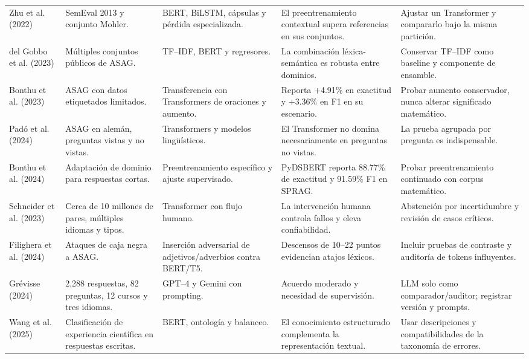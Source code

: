 \documentclass[11pt,oneside,openany]{book}
\begin{document}
\begin{longtable}{@{}P{2.55cm}P{2.5cm}P{3.05cm}P{3.15cm}P{3.05cm}@{}}
Zhu et al. (2022) & SemEval 2013 y conjunto Mohler. & BERT, BiLSTM, cápsulas y
pérdida especializada. & El preentrenamiento contextual supera referencias en sus
conjuntos. & Ajustar un Transformer y compararlo bajo la misma partición.\\[2mm]

del Gobbo et al. (2023) & Múltiples conjuntos públicos de ASAG. & TF--IDF, BERT y
regresores. & La combinación léxica-semántica es robusta entre dominios. & Conservar
TF--IDF como baseline y componente de ensamble.\\[2mm]

Bonthu et al. (2023) & ASAG con datos etiquetados limitados. & Transferencia con
Transformers de oraciones y aumento. & Reporta +4.91\% en exactitud y +3.36\% en F1
en su escenario. & Probar aumento conservador, nunca alterar significado
matemático.\\[2mm]

Padó et al. (2024) & ASAG en alemán, preguntas vistas y no vistas. & Transformers y
modelos lingüísticos. & El Transformer no domina necesariamente en preguntas no
vistas. & La prueba agrupada por pregunta es indispensable.\\[2mm]

Bonthu et al. (2024) & Adaptación de dominio para respuestas cortas. &
Preentrenamiento específico y ajuste supervisado. & PyDSBERT reporta 88.77\% de
exactitud y 91.59\% F1 en SPRAG. & Probar preentrenamiento continuado con corpus
matemático.\\[2mm]

Schneider et al. (2023) & Cerca de 10 millones de pares, múltiples idiomas y tipos.
& Transformer con flujo humano. & La intervención humana controla fallos y eleva
confiabilidad. & Abstención por incertidumbre y revisión de casos críticos.\\[2mm]

Filighera et al. (2024) & Ataques de caja negra a ASAG. & Inserción adversarial de
adjetivos/adverbios contra BERT/T5. & Descensos de 10--22 puntos evidencian atajos
léxicos. & Incluir pruebas de contraste y auditoría de tokens influyentes.\\[2mm]

Grévisse (2024) & 2,288 respuestas, 82 preguntas, 12 cursos y tres idiomas. &
GPT--4 y Gemini con prompting. & Acuerdo moderado y necesidad de supervisión. & LLM
solo como comparador/auditor; registrar versión y prompts.\\[2mm]

Wang et al. (2025) & Clasificación de experiencia científica en respuestas
escritas. & BERT, ontología y balanceo. & El conocimiento estructurado complementa
la representación textual. & Usar descripciones y compatibilidades de la taxonomía
de errores.\\[2mm]


\end{longtable}
\end{document}
